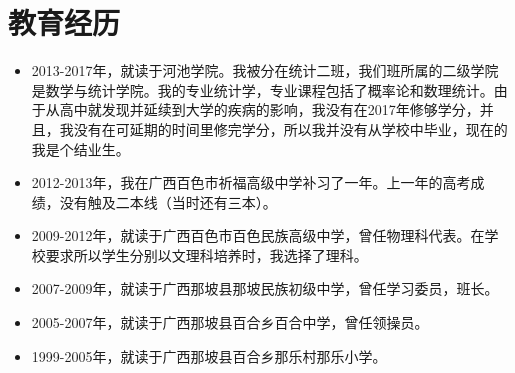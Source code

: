 \section{教育经历}
\begin{itemize}
	\item 2013-2017年，就读于河池学院。我被分在统计二班，我们班所属的二级学院是数学与统计学院。我的专业统计学，专业课程包括了概率论和数理统计。由于从高中就发现并延续到大学的疾病的影响，我没有在2017年修够学分，并且，我没有在可延期的时间里修完学分，所以我并没有从学校中毕业，现在的我是个结业生。%
	\item 2012-2013年，我在广西百色市祈福高级中学补习了一年。上一年的高考成绩，没有触及二本线（当时还有三本）。
	\item 2009-2012年，就读于广西百色市百色民族高级中学，曾任物理科代表。在学校要求所以学生分别以文理科培养时，我选择了理科。
	\item 2007-2009年，就读于广西那坡县那坡民族初级中学，曾任学习委员，班长。
	\item 2005-2007年，就读于广西那坡县百合乡百合中学，曾任领操员。
	\item 1999-2005年，就读于广西那坡县百合乡那乐村那乐小学。
\end{itemize}
